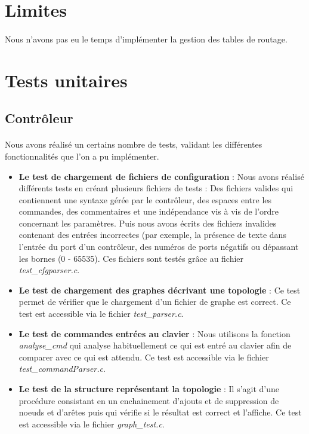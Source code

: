 \section{Limites}
\paragraph{}Nous n'avons pas eu le temps d'implémenter la gestion des tables de routage. 
\section{Tests unitaires}
\subsection{Contrôleur}
\paragraph{}Nous avons réalisé un certains nombre de tests, validant les différentes fonctionnalités que l'on a pu implémenter.
\begin{itemize}
\item \textbf{Le test de chargement de fichiers de configuration} : Nous avons réalisé différents tests en créant plusieurs fichiers de tests : Des fichiers valides qui contiennent une syntaxe gérée par le contrôleur, des espaces entre les commandes, des commentaires et une indépendance vis à vis de l'ordre concernant les paramètres. Puis nous avons écrits des fichiers invalides contenant des entrées incorrectes (par exemple, la présence de texte dans l'entrée du port d'un contrôleur, des numéros de ports négatifs ou dépassant les bornes (0 - 65535). Ces fichiers sont testés grâce au fichier \textit{test\_cfgparser.c}.
\item \textbf{Le test de chargement des graphes décrivant une topologie} : Ce test permet de vérifier que le chargement d'un fichier de graphe est correct. Ce test est accessible via le fichier \textit{test\_parser.c}.
\item \textbf{Le test de commandes entrées au clavier} : Nous utilisons la fonction \textit{analyse\_cmd} qui analyse habituellement ce qui est entré au clavier afin de comparer avec ce qui est attendu. Ce test est accessible via le fichier \textit{test\_commandParser.c}. 
\item \textbf{Le test de la structure représentant la topologie} : Il s'agit d'une procédure consistant en un enchainement d'ajouts et de suppression de noeuds et d'arêtes puis qui vérifie si le résultat est correct et l'affiche. Ce test est accessible via le fichier \textit{graph\_test.c}.
\end{itemize}

